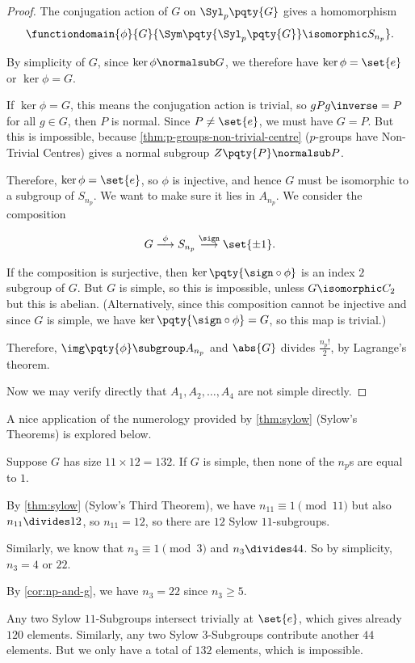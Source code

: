 \begin{proof}
    The conjugation action of \(G\) on \(\Syl_p\pqty{G}\) gives a homomorphism
    \[
        \functiondomain{\phi}{G}{\Sym\pqty{\Syl_p\pqty{G}} \isomorphic S_{n_p}}.
    \]

    By simplicity of \(G\), since \(\ker \phi \normalsub G\), we therefore have \(\ker \phi = \set{e}\) or \(\ker \phi = G\).

    If \(\ker \phi = G\), this means the conjugation action is trivial, so \(g P g\inverse = P\) for all \(g \in G\), then \(P\) is normal. Since \(P \neq \set{e}\), we must have \(G = P\). But this is impossible, because \autoref{thm:p-groups-non-trivial-centre} (\(p\)-groups have Non-Trivial Centres) gives a normal subgroup \(Z\pqty{P} \normalsub P\).

    Therefore, \(\ker \phi = \set{e}\), so \(\phi\) is injective, and hence \(G\) must be isomorphic to a subgroup of \(S_{n_p}\). We want to make sure it lies in \(A_{n_p}\). We consider the composition

    \[
        G \overset{\phi}{\longrightarrow} S_{n_p} \overset{\sign}{\longrightarrow} \set{\pm 1}.
    \]

    If the composition is surjective, then \(\ker \pqty{\sign \circ \phi}\) is an index \(2\) subgroup of \(G\). But \(G\) is simple, so this is impossible, unless \(G \isomorphic C_2\) but this is abelian. (Alternatively, since this composition cannot be injective and since \(G\) is simple, we have \(\ker \pqty{\sign \circ \phi} = G\), so this map is trivial.)

    Therefore, \(\img \pqty{\phi} \subgroup A_{n_p}\) and \(\abs{G}\) divides \(\frac{n_p!}{2}\), by Lagrange's theorem.

    Now we may verify directly that \(A_1, A_2, \ldots, A_4\) are not simple directly.
\end{proof}

A nice application of the numerology provided by \autoref{thm:sylow} (Sylow's Theorems) is explored below.

\begin{example*}
    Suppose \(G\) has size \(11 \times 12 = 132\). If \(G\) is simple, then none of the \(n_p\)s are equal to \(1\).

    By \autoref{thm:sylow} (Sylow's Third Theorem), we have \(n_{11} \equiv 1 \pmod{11}\) but also \(n_{11} \divides 12\), so \(n_{11} = 12\), so there are \(12\) Sylow \(11\)-subgroups.

    Similarly, we know that \(n_3 \equiv 1 \pmod{3}\) and \(n_3 \divides 44\). So by simplicity, \(n_3 = 4\) or \(22\).

    By \autoref{cor:np-and-g}, we have \(n_3 = 22\) since \(n_3 \geq 5\).

    Any two Sylow \(11\)-Subgroups intersect trivially at \(\set{e}\), which gives already \(120\) elements. Similarly, any two Sylow \(3\)-Subgroups contribute another \(44\) elements. But we only have a total of \(132\) elements, which is impossible.
\end{example*}

